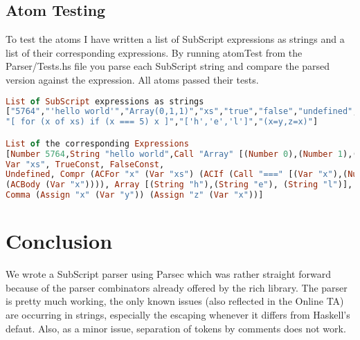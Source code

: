 \documentclass{article}
\begin{document}
\subsection{Atom Testing}
To test the atoms I have written a list of SubScript expressions as strings and a list of their corresponding expressions. By running atomTest from the Parser/Tests.hs file you parse each SubScript string and compare the parsed version against the expression. All atoms passed their tests.
\begin{lstlisting}[language=Haskell]
List of SubScript expressions as strings
["5764","'hello world'","Array(0,1,1)","xs","true","false","undefined",
"[ for (x of xs) if (x === 5) x ]","['h','e','l']","(x=y,z=x)"]

List of the corresponding Expressions
[Number 5764,String "hello world",Call "Array" [(Number 0),(Number 1),(Number 1)],
Var "xs", TrueConst, FalseConst, 
Undefined, Compr (ACFor "x" (Var "xs") (ACIf (Call "===" [(Var "x"),(Number 5)]) 
(ACBody (Var "x")))), Array [(String "h"),(String "e"), (String "l")], 
Comma (Assign "x" (Var "y")) (Assign "z" (Var "x"))]
\end{lstlisting}


\section{Conclusion}
We wrote a SubScript parser using Parsec which was rather straight forward because of the parser combinators already offered by the rich
library.
The parser is pretty much working, the only known issues (also reflected in the Online TA) are occurring in strings, especially the escaping whenever it differs from Haskell's defaut. Also, as a minor issue, separation of tokens by comments does not work.
\end{document}

